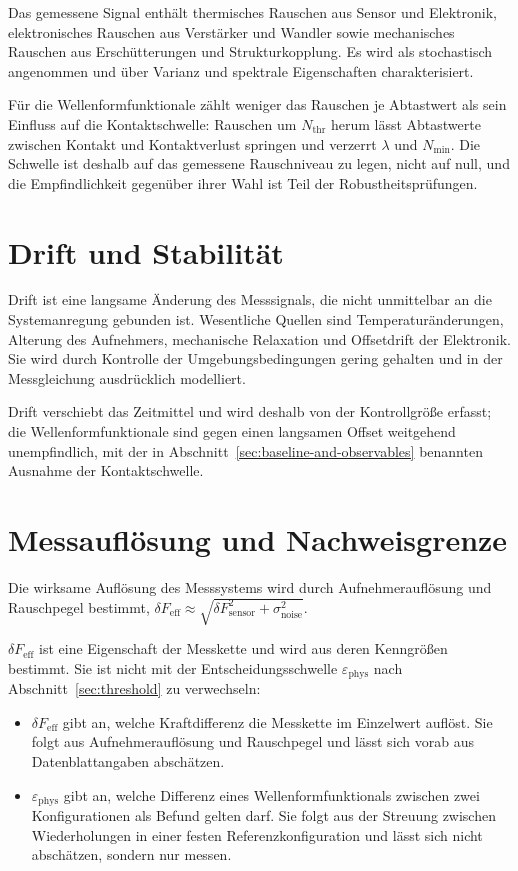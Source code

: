 \documentclass[12pt,a4paper]{report}
\begin{document}
Das gemessene Signal enthält thermisches Rauschen aus Sensor und
Elektronik, elektronisches Rauschen aus Verstärker und Wandler sowie
mechanisches Rauschen aus Erschütterungen und Strukturkopplung. Es wird
als stochastisch angenommen und über Varianz und spektrale Eigenschaften
charakterisiert.

Für die Wellenformfunktionale zählt weniger das Rauschen je Abtastwert
als sein Einfluss auf die Kontaktschwelle: Rauschen um $N_{\mathrm{thr}}$
herum lässt Abtastwerte zwischen Kontakt und Kontaktverlust springen und
verzerrt $\lambda$ und $N_{\min}$. Die Schwelle ist deshalb auf das
gemessene Rauschniveau zu legen, nicht auf null, und die Empfindlichkeit
gegenüber ihrer Wahl ist Teil der Robustheitsprüfungen.

\section{Drift und Stabilität}

Drift ist eine langsame Änderung des Messsignals, die nicht unmittelbar
an die Systemanregung gebunden ist. Wesentliche Quellen sind
Temperaturänderungen, Alterung des Aufnehmers, mechanische Relaxation
und Offsetdrift der Elektronik. Sie wird durch Kontrolle der
Umgebungsbedingungen gering gehalten und in der Messgleichung
ausdrücklich modelliert.

Drift verschiebt das Zeitmittel und wird deshalb von der Kontrollgröße
erfasst; die Wellenformfunktionale sind gegen einen langsamen Offset
weitgehend unempfindlich, mit der in
Abschnitt~\ref{sec:baseline-and-observables} benannten Ausnahme der
Kontaktschwelle.

\section{Messauflösung und Nachweisgrenze}

Die wirksame Auflösung des Messsystems wird durch Aufnehmerauflösung und
Rauschpegel bestimmt,
$\delta F_{\text{eff}} \approx \sqrt{\delta F_{\text{sensor}}^2 + \sigma_{\text{noise}}^2}$.

$\delta F_{\text{eff}}$ ist eine Eigenschaft der Messkette und wird aus
deren Kenngrößen bestimmt. Sie ist nicht mit der Entscheidungsschwelle
$\varepsilon_{\mathrm{phys}}$ nach Abschnitt~\ref{sec:threshold} zu
verwechseln:

\begin{itemize}
\item $\delta F_{\text{eff}}$ gibt an, welche Kraftdifferenz die
      Messkette im Einzelwert auflöst. Sie folgt aus Aufnehmerauflösung
      und Rauschpegel und lässt sich vorab aus Datenblattangaben
      abschätzen.
\item $\varepsilon_{\mathrm{phys}}$ gibt an, welche Differenz eines
      Wellenformfunktionals zwischen zwei Konfigurationen als Befund
      gelten darf. Sie folgt aus der Streuung zwischen Wiederholungen in
      einer festen Referenzkonfiguration und lässt sich nicht
      abschätzen, sondern nur messen.
\end{itemize}
\end{document}

